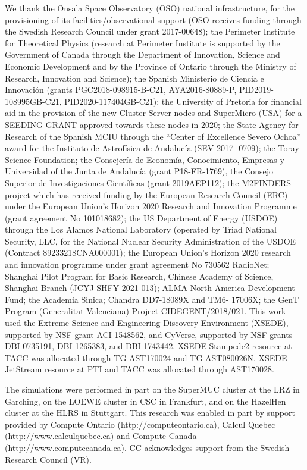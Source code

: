 We thank the Onsala Space Observatory
(OSO) national infrastructure, for the provisioning
of its facilities/observational support (OSO receives
funding through the Swedish Research Council under
grant 2017-00648);  the Perimeter Institute for Theoretical
Physics (research at Perimeter Institute is supported
by the Government of Canada through the Department
of Innovation, Science and Economic Development
and by the Province of Ontario through the
Ministry of Research, Innovation and Science); the Spanish Ministerio de Ciencia e Innovación (grants PGC2018-098915-B-C21, AYA2016-80889-P,
PID2019-108995GB-C21, PID2020-117404GB-C21); 
the University of Pretoria for financial aid in the provision of the new 
Cluster Server nodes and SuperMicro (USA) for a SEEDING GRANT approved towards these 
nodes in 2020;
the State
Agency for Research of the Spanish MCIU through
the ``Center of Excellence Severo Ochoa'' award for
the Instituto de Astrofísica de Andalucía (SEV-2017-
0709); the Toray Science Foundation; the Consejería de Economía, Conocimiento, 
Empresas y Universidad 
of the Junta de Andalucía (grant P18-FR-1769), the Consejo Superior de Investigaciones 
Científicas (grant 2019AEP112);
the M2FINDERS project which has received funding by the European Research Council (ERC) under 
the European Union’s Horizon 2020 Research and Innovation Programme (grant agreement No 101018682);
the US Department
of Energy (USDOE) through the Los Alamos National
Laboratory (operated by Triad National Security,
LLC, for the National Nuclear Security Administration
of the USDOE (Contract 89233218CNA000001);
 the European Union’s Horizon 2020
research and innovation programme under grant agreement
No 730562 RadioNet;
Shanghai Pilot Program for Basic Research, Chinese Academy of Science, 
Shanghai Branch (JCYJ-SHFY-2021-013);
ALMA North America Development
Fund; the Academia Sinica; Chandra DD7-18089X and TM6-
17006X; the GenT Program (Generalitat Valenciana)
Project CIDEGENT/2018/021. This work used the
Extreme Science and Engineering Discovery Environment
(XSEDE), supported by NSF grant ACI-1548562,
and CyVerse, supported by NSF grants DBI-0735191,
DBI-1265383, and DBI-1743442. XSEDE Stampede2 resource
at TACC was allocated through TG-AST170024
and TG-AST080026N. XSEDE JetStream resource at
PTI and TACC was allocated through AST170028.


The simulations were performed in part on the SuperMUC
cluster at the LRZ in Garching, on the
LOEWE cluster in CSC in Frankfurt, and on the
HazelHen cluster at the HLRS in Stuttgart. This
research was enabled in part by support provided
by Compute Ontario (http://computeontario.ca), Calcul
Quebec (http://www.calculquebec.ca) and Compute
Canada (http://www.computecanada.ca). 
CC acknowledges support from the Swedish Research Council (VR).

